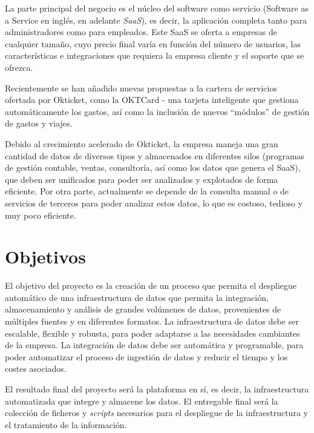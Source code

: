 La parte principal del negocio es el núcleo del software como servicio (Software
as a Service en inglés, en adelante \textit{SaaS}), es decir, la aplicación
completa tanto para administradores como para empleados. Este SaaS se oferta a
empresas de cualquier tamaño, cuyo precio final varía en función del número de
usuarios, las características e integraciones que requiera la empresa cliente y
el soporte que se ofrezca.

Recientemente se han añadido nuevas propuestas a la cartera de servicios
ofertada por Okticket, como la OKTCard {-} una tarjeta inteligente que gestiona
automáticamente los gastos, así como la inclusión de nuevos ``módulos'' de
gestión de gastos y viajes.

Debido al crecimiento acelerado de Okticket, la empresa maneja una gran cantidad
de datos de diversos tipos y almacenados en diferentes silos (programas de
gestión contable, ventas, consultoría, así como los datos que genera el SaaS),
que deben ser unificados para poder ser analizados y explotados de forma eficiente.
Por otra parte, actualmente se depende de la consulta manual o de servicios de
terceros para poder analizar estos datos, lo que es costoso, tedioso y muy
poco eficiente.

\section{Objetivos}\label{sec:objetivos}
El objetivo del proyecto es la creación de un proceso que permita el despliegue
automático de una infraestructura de datos que permita la integración,
almacenamiento y análisis de grandes volúmenes de datos, provenientes de
múltiples fuentes y en diferentes formatos. La infraestructura de datos debe ser
escalable, flexible y robusta, para poder adaptarse a las necesidades cambiantes
de la empresa. La integración de datos debe ser automática y programable, para
poder automatizar el proceso de ingestión de datos y reducir el tiempo y los
costes asociados.

El resultado final del proyecto será la plataforma en sí, es decir, la
infraestructura automatizada que integre y almacene los datos. El entregable
final será la colección de ficheros y \textit{scripts} necesarios para el
despliegue de la infraestructura y el tratamiento de la información.
